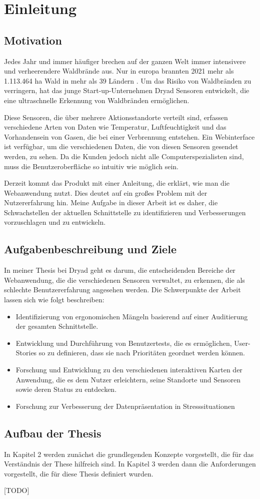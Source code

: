 \chapter{Einleitung}

\section{Motivation}

Jedes Jahr und immer häufiger brechen auf der ganzen Welt immer intensivere und verheerendere Waldbrände aus.
Nur in europa brannten 2021 mehr als 1.113.464 ha Wald in mehr als 39 Ländern \cite{JRC}.
Um das Risiko von Waldbränden zu verringern, hat das junge Start-up-Unternehmen Dryad Sensoren entwickelt, die eine ultraschnelle Erkennung von Waldbränden ermöglichen.

Diese Sensoren, die über mehrere Aktionsstandorte verteilt sind, erfassen verschiedene Arten von Daten wie Temperatur, Luftfeuchtigkeit und das Vorhandensein von Gasen, die bei einer Verbrennung entstehen.
Ein Webinterface ist verfügbar, um die verschiedenen Daten, die von diesen Sensoren gesendet werden, zu sehen.
Da die Kunden jedoch nicht alle Computerspezialisten sind, muss die Benutzeroberfläche so intuitiv wie möglich sein.

Derzeit kommt das Produkt mit einer Anleitung, die erklärt, wie man die Webanwendung nutzt. Dies deutet auf ein großes Problem mit der Nutzererfahrung hin.
Meine Aufgabe in dieser Arbeit ist es daher, die Schwachstellen der aktuellen Schnittstelle zu identifizieren und Verbesserungen vorzuschlagen und zu entwickeln.

\section{Aufgabenbeschreibung und Ziele}

In meiner Thesis bei Dryad geht es darum, die entscheidenden Bereiche der Webanwendung, die die verschiedenen Sensoren verwaltet, zu erkennen, die als schlechte Benutzererfahrung angesehen werden.
Die Schwerpunkte der Arbeit lassen sich wie folgt beschreiben:

\begin{itemize}
  \item Identifizierung von ergonomischen Mängeln basierend auf einer Auditierung der gesamten Schnittstelle.
  \item Entwicklung und Durchführung von Benutzertests, die es ermöglichen, User-Stories so zu definieren, dass sie nach Prioritäten geordnet werden können.
  \item Forschung und Entwicklung zu den verschiedenen interaktiven Karten der Anwendung, die es dem Nutzer erleichtern, seine Standorte und Sensoren sowie deren Status zu entdecken.
  \item Forschung zur Verbesserung der Datenpräsentation in Stresssituationen
\end{itemize}

\section{Aufbau der Thesis}

In Kapitel 2 werden zunächst die grundlegenden Konzepte vorgestellt, die für das Verständnis der These hilfreich sind. In Kapitel 3 werden dann die Anforderungen vorgestellt, die für diese Thesis definiert wurden.

  [TODO]